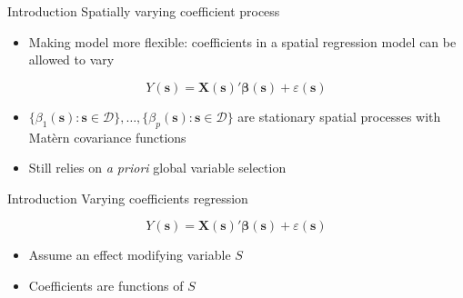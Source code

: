 \documentclass[12pt,t]{beamer}
\newcommand{\subt}[1]{{\footnotesize \color{subtitle} {#1}}}
\begin{document}
\begin{frame}{Introduction}
\subt{Spatially varying coefficient process \citep{Gelfand:2003}}

\bigskip
\begin{itemize}
    \item Making model more flexible: coefficients in a spatial regression model can be allowed to vary
\end{itemize}

\[
    Y(\bm{s}) = \bm{X}(\bm{s})' \bm{\beta}(\bm{s}) + \varepsilon(\bm{s})
\]
\begin{itemize}
  \item $\{ \beta_1(\bm{s}) : \bm{s} \in \mathcal{D}\}, \dots, \{\beta_p(\bm{s}) : \bm{s} \in \mathcal{D}\}$ are stationary spatial processes with Mat\`{e}rn covariance functions
  \item Still relies on \emph{a priori} global variable selection
\end{itemize}

\end{frame}





\begin{frame}{Introduction}
\subt{Varying coefficients regression \citep{Hastie:1993a}}

\[
    Y(\bm{s}) = \bm{X}(\bm{s})' \bm{\beta}(\bm{s}) + \varepsilon(\bm{s})
\]

\begin{itemize}
    \item Assume an effect modifying variable $S$
    \item Coefficients are functions of $S$
\end{itemize}

\end{frame}
\end{document}
